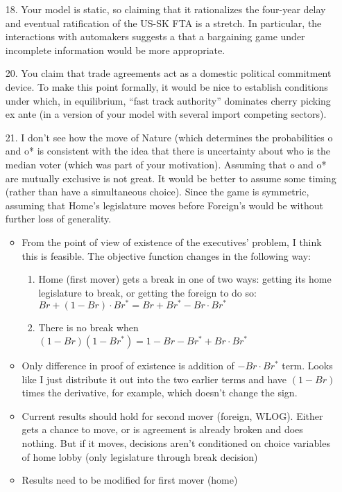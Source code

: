 \documentclass[12pt]{article}
\begin{document}
\begin{enumerate}
	\item[18.] Your model is static, so claiming that it rationalizes the four-year delay and eventual ratification of the US-SK FTA is a stretch. In particular, the interactions with automakers suggests a that a bargaining game under incomplete information would be more appropriate.
  \item[20.] You claim that trade agreements act as a domestic political commitment device. To make this point formally, it would be nice to establish conditions under which, in equilibrium, “fast track authority” dominates cherry picking ex ante (in a version of your model with several import competing sectors).
	\item[21.] I don’t see how the move of Nature (which determines the probabilities o and o* is consistent with the idea that there is uncertainty about who is the median voter (which was part of your motivation). Assuming that o and o* are mutually exclusive is not great. It would be better to assume some timing (rather than have a simultaneous choice). Since the game is symmetric, assuming that Home’s legislature moves before Foreign’s would be without further loss of generality.
		\begin{itemize}
			\item From the point of view of existence of the executives' problem, I think this is feasible. The objective function changes in the following way:
				\begin{enumerate}
					\item Home (first mover) gets a break in one of two ways: getting its home legislature to break, or getting the foreign to do so: $Br + (1-Br)\cdot Br^* = Br + Br^* - Br \cdot Br^*$
					\item There is no break when $(1-Br)(1-Br^*) = 1 - Br - Br^* + Br \cdot Br^*$
				\end{enumerate}
			\item Only difference in proof of existence is addition of $- Br \cdot Br^*$ term. Looks like I just distribute it out into the two earlier terms and have $(1 - Br)$ times the derivative, for example, which doesn't change the sign.
			\item Current results should hold for second mover (foreign, WLOG). Either gets a chance to move, or is agreement is already broken and does nothing. But if it moves, decisions aren't conditioned on choice variables of home lobby (only legislature through break decision)
			\item Results need to be modified for first mover (home)

\end{itemize}
\end{enumerate}
\end{document}
